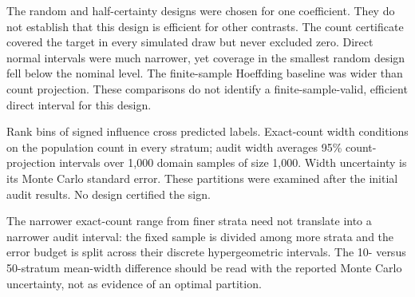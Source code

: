 The random and half-certainty designs were chosen for one coefficient. They do
not establish that this design is efficient for other contrasts. The count
certificate covered the target in every simulated draw but never excluded
zero. Direct normal intervals were much narrower, yet coverage in the smallest
random design fell below the nominal level. The finite-sample Hoeffding
baseline was wider than count projection. These comparisons do not identify a
finite-sample-valid, efficient direct interval for this design.

\begin{table}[htbp]
\centering\small
\caption{Refining validation strata for the focal coefficient}
\label{tab:refinement}

\par\smallskip
\begin{minipage}{\linewidth}\footnotesize
Rank bins of signed influence cross predicted labels. Exact-count width
conditions on the population count in every stratum; audit width averages
95\% count-projection intervals over 1,000 domain samples of size 1,000.
Width uncertainty is its Monte Carlo standard error. These partitions were
examined after the initial audit results. No design certified the sign.
\end{minipage}
\end{table}

The narrower exact-count range from finer strata need not translate into a
narrower audit interval: the fixed sample is divided among more strata and
the error budget is split across their discrete hypergeometric intervals.
The 10- versus 50-stratum mean-width difference should be read with the
reported Monte Carlo uncertainty, not as evidence of an optimal partition.
